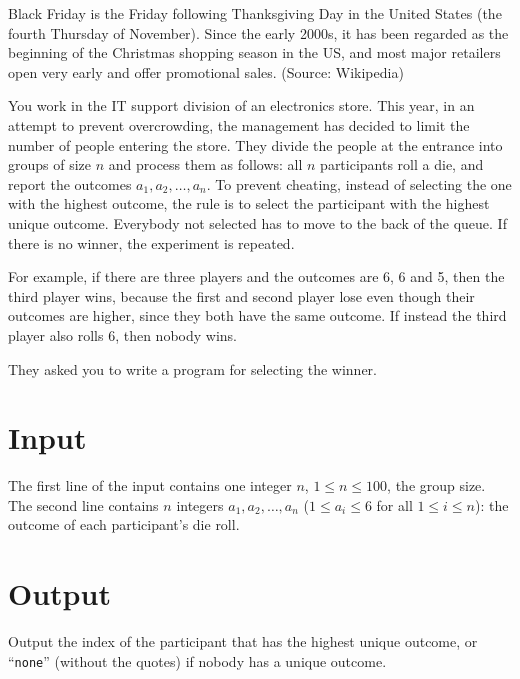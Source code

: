 

\noindent

Black Friday is the Friday following Thanksgiving Day in the United States (the fourth Thursday of November). Since the early 2000s, it has been regarded as the beginning of the Christmas shopping season in the US, and most major retailers open very early and offer promotional sales. (Source: Wikipedia)

You work in the IT support division of an electronics store.
This year, in an attempt to prevent overcrowding, the management has decided to limit the number of people entering the store.
They divide the people at the entrance into groups of size $n$ and process them as follows:
all $n$ participants roll a die, and report the outcomes $a_1, a_2, \ldots, a_n$.
To prevent cheating, instead of selecting the one with the highest outcome, the rule is to select the participant with the highest unique outcome.
Everybody not selected has to move to the back of the queue.
If there is no winner, the experiment is repeated.

For example, if there are three players and the outcomes are 6, 6 and 5, then the third player wins,
because the
first and second player lose even though their outcomes are higher,
since they both have the same outcome.
If instead the third player also rolls 6, then nobody wins.

They asked you to write a program for selecting the winner.

\section*{Input}
The first line of the input contains one integer $n$, $1 \leq n \leq 100$, the group size.
The second line contains $n$ integers $a_1, a_2, \ldots, a_n$ ($1 \leq a_i \leq 6$ for all $1 \leq i \leq n$): the outcome of each participant's die roll.

\section*{Output}
Output the index of the participant that has the highest unique outcome, or ``\texttt{none}'' (without the quotes) if nobody has a unique outcome.
